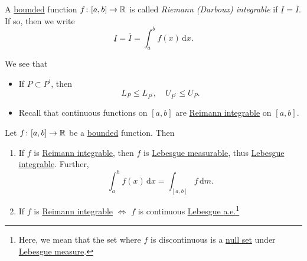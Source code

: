 \begin{definition}\label{def:Riemann-integrable}
	A \underline{bounded} function \(f\colon [a, b]\to \mathbb{\MakeUppercase{r}} \) is called \emph{Riemann (Darboux) integrable}
	if \(\underline{I} = \overline{I}\). If so, then we write
	\[
		\underline{I} = \overline{I} = \int_{a}^{b} f(x) \,\mathrm{d}x.
	\]
\end{definition}
\begin{note}
	We see that
	\begin{itemize}
		\item If \(P\subset P ^\prime \), then
		      \[
			      L_{P}\leq L_{P ^\prime },\quad U_{P ^\prime }\leq U_{P}.
		      \]
		\item Recall that continuous functions on \([a, b]\) are \hyperref[def:Riemann-integrable]{Reimann integrable} on \([a, b]\).
	\end{itemize}
\end{note}
\begin{theorem}
	Let \(f\colon [a, b]\to \mathbb{\MakeUppercase{r}} \) be a \underline{bounded} function. Then
	\begin{enumerate}[(1)]
		\item If \(f\) is \hyperref[def:Riemann-integrable]{Reimann integrable}, then \(f\) is \hyperref[def:measurable-function]{Lebesgue measurable}, thus
		      \hyperref[def:integrable]{Lebesgue integrable}. Further,
		      \[
			      \int_{a}^{b} f(x) \,\mathrm{d}x = \int_{[a, b]}f \,\mathrm{d}m.
		      \]
		\item If \(f\) is \hyperref[def:Riemann-integrable]{Reimann integrable} \(\iff \) \(f\) is continuous \underline{\hyperref[def:Lebesgue-measure]{Lebesgue} \hyperref[def:mu-almost-everywhere]{a.e.}}\footnote{Here, we
			      mean that the set where \(f\) is discontinuous is a \hyperref[def:mu-null-set]{null set} under \hyperref[def:Lebesgue-measure]{Lebesgue measure}.}
	\end{enumerate}
\end{theorem}
